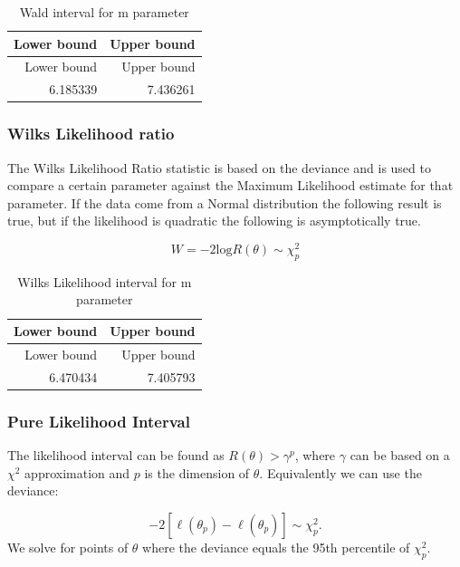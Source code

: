 \documentclass[11pt,preprint, authoryear]{elsarticle}
\numberwithin{equation}{section}
\numberwithin{figure}{section}
\numberwithin{table}{section}
\begin{document}
\begin{longtable}[]{@{}rr@{}}
\caption{Wald interval for m parameter}\tabularnewline
\toprule
Lower bound & Upper bound\tabularnewline
\midrule
\endfirsthead
\toprule
Lower bound & Upper bound\tabularnewline
\midrule
\endhead
6.185339 & 7.436261\tabularnewline
\bottomrule
\end{longtable}

\subsubsection{Wilks Likelihood ratio}\label{wilks-likelihood-ratio}

The Wilks Likelihood Ratio statistic is based on the deviance and is
used to compare a certain parameter against the Maximum Likelihood
estimate for that parameter. If the data come from a Normal distribution
the following result is true, but if the likelihood is quadratic the
following is asymptotically true.

\[W = -2\text{log}R(\theta) \sim \chi^2_p\]

\begin{longtable}[]{@{}rr@{}}
\caption{Wilks Likelihood interval for m parameter}\tabularnewline
\toprule
Lower bound & Upper bound\tabularnewline
\midrule
\endfirsthead
\toprule
Lower bound & Upper bound\tabularnewline
\midrule
\endhead
6.470434 & 7.405793\tabularnewline
\bottomrule
\end{longtable}

\subsubsection{Pure Likelihood Interval}\label{pure-likelihood-interval}

The likelihood interval can be found as \(R(\theta) > \gamma^p\), where
\(\gamma\) can be based on a \(\chi^2\) approximation and \(p\) is the
dimension of \(\theta\). Equivalently we can use the deviance:

\[ -2[\ell(\theta_p) - \ell(\hat{\theta_p})] \sim \chi^2_p. \] We solve
for points of \(\theta\) where the deviance equals the 95th percentile
of \(\chi^2_p\).
\end{document}
